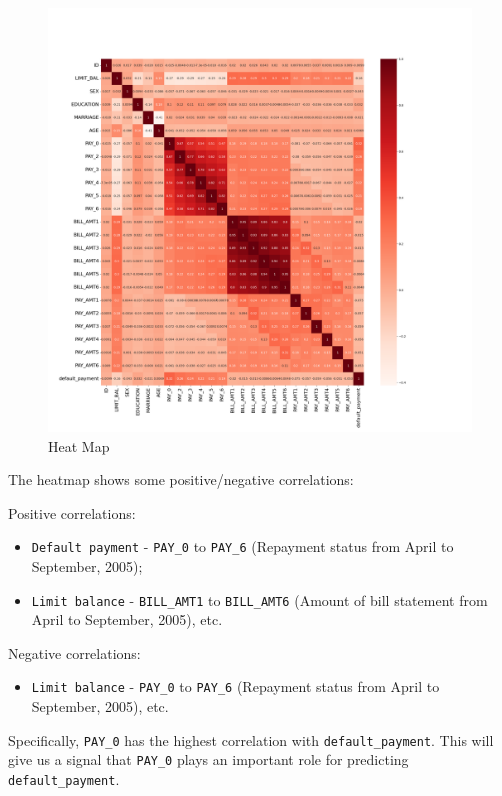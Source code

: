 \documentclass[
]{article}
\providecommand{\tightlist}{%
  \setlength{\itemsep}{0pt}\setlength{\parskip}{0pt}}
\begin{document}
\begin{figure}

{\centering \includegraphics[width=0.8\linewidth]{../results/heatmap} 

}

\caption{Heat Map}\label{fig:heat-map}
\end{figure}

The heatmap shows some positive/negative correlations:

Positive correlations:

\begin{itemize}
\tightlist
\item
  \texttt{Default\ payment} - \texttt{PAY\_0} to \texttt{PAY\_6}
  (Repayment status from April to September, 2005);
\item
  \texttt{Limit\ balance} - \texttt{BILL\_AMT1} to \texttt{BILL\_AMT6}
  (Amount of bill statement from April to September, 2005), etc.
\end{itemize}

Negative correlations:

\begin{itemize}
\tightlist
\item
  \texttt{Limit\ balance} - \texttt{PAY\_0} to \texttt{PAY\_6}
  (Repayment status from April to September, 2005), etc.
\end{itemize}

Specifically, \texttt{PAY\_0} has the highest correlation with
\texttt{default\_payment}. This will give us a signal that
\texttt{PAY\_0} plays an important role for predicting
\texttt{default\_payment}.
\end{document}
